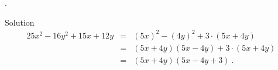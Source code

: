 \begin{MExercises}
\begin{MExercise}
\begin{MExerciseItems}
\item{. \begin{MHint}{Solution}\begin{eqnarray*}25x^2-16y^2+15x+12y&=&(5x)^2-(4y)^2+3\cdot(5x+4y)\ \\ &=& (5x+4y)(5x-4y)+3\cdot(5x+4y)\ \\ &=& (5x+4y)(5x-4y+3)  \: .\end{eqnarray*}\end{MHint}}
\end{MExerciseItems}
\end{MExercise}
\end{MExercises}


